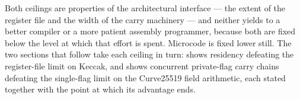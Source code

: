 \medskip
\noindent Both ceilings are properties of the architectural interface --- the
extent of the register file and the width of the carry machinery --- and neither
yields to a better compiler or a more patient assembly programmer, because both
are fixed below the level at which that effort is spent. Microcode is fixed lower
still. The two sections that follow take each ceiling in turn: 
shows residency defeating the register-file limit on Keccak, and
 shows concurrent private-flag carry chains defeating the
single-flag limit on the Curve25519 field arithmetic, each stated together with
the point at which its advantage ends.
